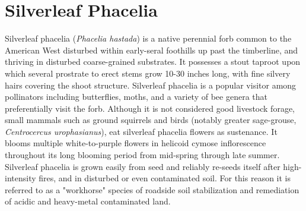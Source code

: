 \documentclass{article}
\begin{document}
\section{Silverleaf Phacelia}

Silverleaf phacelia (\textit{Phacelia hastada}) is a native perennial forb common to the American West disturbed within early-seral foothills up past the timberline, and thriving in disturbed coarse-grained substrates. It possesses a stout taproot upon which several prostrate to erect stems grow 10-30 inches long, with fine silvery hairs covering the shoot structure. Silverleaf phacelia is a popular visitor among pollinators including butterflies, moths, and a variety of bee genera that preferentially visit the forb. Although it is not considered good livestock forage, small mammals such as ground squirrels and birds (notably greater sage-grouse, \textit{Centrocercus urophasianus}), eat silverleaf phacelia flowers as sustenance. It blooms multiple white-to-purple flowers in helicoid cymose inflorescence throughout its long blooming period from mid-spring through late summer. Silverleaf phacelia is grown easily from seed and reliably re-seeds itself after high-intensity fires, and in disturbed or even contaminated soil. For this reason it is referred to as a "workhorse" species of roadside soil stabilization and remediation of acidic and heavy-metal contaminated land.
\end{document}

